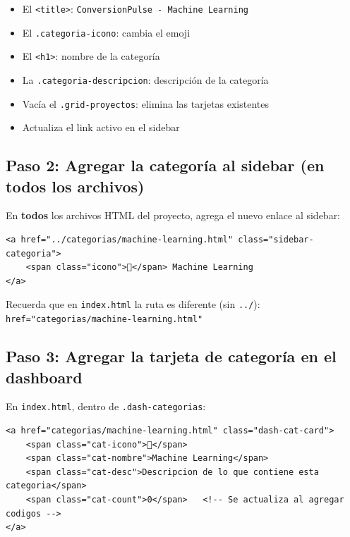 \documentclass[12pt, a4paper]{article}
\newcommand{\archivo}[1]{\texttt{\textcolor{cpAccent}{#1}}}
\newcommand{\clase}[1]{\texttt{\textcolor{cpAzul}{.#1}}}
\newcommand{\etiquetaHtml}[1]{\texttt{\textcolor{cpKeyword}{<#1>}}}
\begin{document}
\begin{itemize}[leftmargin=1.5em]
    \item El \etiquetaHtml{title}: \texttt{ConversionPulse - Machine Learning}
    \item El \clase{categoria-icono}: cambia el emoji
    \item El \etiquetaHtml{h1}: nombre de la categoría
    \item La \clase{categoria-descripcion}: descripción de la categoría
    \item Vacía el \clase{grid-proyectos}: elimina las tarjetas existentes
    \item Actualiza el link activo en el sidebar
\end{itemize}

\subsection{Paso 2: Agregar la categoría al sidebar (en todos los archivos)}

En \textbf{todos} los archivos HTML del proyecto, agrega el nuevo enlace al sidebar:

\begin{lstlisting}[style=htmlstyle]
<a href="../categorias/machine-learning.html" class="sidebar-categoria">
    <span class="icono">🤖</span> Machine Learning
</a>
\end{lstlisting}

\begin{cajaAviso}
    Recuerda que en \archivo{index.html} la ruta es diferente (sin \texttt{../}):
    \texttt{href="categorias/machine-learning.html"}
\end{cajaAviso}

\subsection{Paso 3: Agregar la tarjeta de categoría en el dashboard}

En \archivo{index.html}, dentro de \clase{dash-categorias}:

\begin{lstlisting}[style=htmlstyle]
<a href="categorias/machine-learning.html" class="dash-cat-card">
    <span class="cat-icono">🤖</span>
    <span class="cat-nombre">Machine Learning</span>
    <span class="cat-desc">Descripcion de lo que contiene esta categoria</span>
    <span class="cat-count">0</span>   <!-- Se actualiza al agregar codigos -->
</a>
\end{lstlisting}
\end{document}
